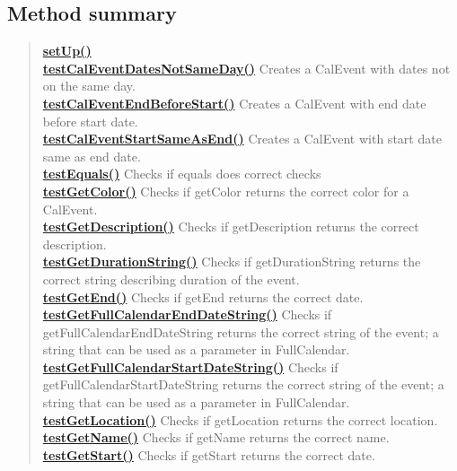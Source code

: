 \documentclass[11pt,a4paper]{report}
\begin{document}
{{\subsection{Method summary}{
\begin{verse}
\hyperlink{is.mpg.ruglan.test.CalEventTest.setUp()}{{\bf setUp()}} \\
\hyperlink{is.mpg.ruglan.test.CalEventTest.testCalEventDatesNotSameDay()}{{\bf testCalEventDatesNotSameDay()}} Creates a CalEvent with dates not on the same day.\\
\hyperlink{is.mpg.ruglan.test.CalEventTest.testCalEventEndBeforeStart()}{{\bf testCalEventEndBeforeStart()}} Creates a CalEvent with end date before start date.\\
\hyperlink{is.mpg.ruglan.test.CalEventTest.testCalEventStartSameAsEnd()}{{\bf testCalEventStartSameAsEnd()}} Creates a CalEvent with start date same as end date.\\
\hyperlink{is.mpg.ruglan.test.CalEventTest.testEquals()}{{\bf testEquals()}} Checks if equals does correct checks\\
\hyperlink{is.mpg.ruglan.test.CalEventTest.testGetColor()}{{\bf testGetColor()}} Checks if getColor returns the correct color for a CalEvent.\\
\hyperlink{is.mpg.ruglan.test.CalEventTest.testGetDescription()}{{\bf testGetDescription()}} Checks if getDescription returns the correct description.\\
\hyperlink{is.mpg.ruglan.test.CalEventTest.testGetDurationString()}{{\bf testGetDurationString()}} Checks if getDurationString returns the correct string describing duration of the event.\\
\hyperlink{is.mpg.ruglan.test.CalEventTest.testGetEnd()}{{\bf testGetEnd()}} Checks if getEnd returns the correct date.\\
\hyperlink{is.mpg.ruglan.test.CalEventTest.testGetFullCalendarEndDateString()}{{\bf testGetFullCalendarEndDateString()}} Checks if getFullCalendarEndDateString returns the correct string of the event; a string that can be used as a parameter in FullCalendar.\\
\hyperlink{is.mpg.ruglan.test.CalEventTest.testGetFullCalendarStartDateString()}{{\bf testGetFullCalendarStartDateString()}} Checks if getFullCalendarStartDateString returns the correct string of the event; a string that can be used as a parameter in FullCalendar.\\
\hyperlink{is.mpg.ruglan.test.CalEventTest.testGetLocation()}{{\bf testGetLocation()}} Checks if getLocation returns the correct location.\\
\hyperlink{is.mpg.ruglan.test.CalEventTest.testGetName()}{{\bf testGetName()}} Checks if getName returns the correct name.\\
\hyperlink{is.mpg.ruglan.test.CalEventTest.testGetStart()}{{\bf testGetStart()}} Checks if getStart returns the correct date.\\
\end{verse}
}
}}
\end{document}
